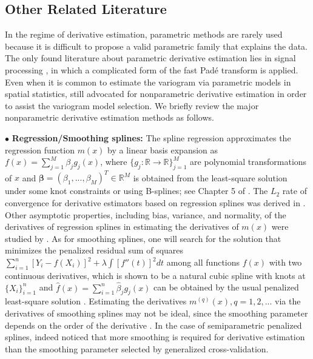 \documentclass{uwstat572}
\theoremstyle{definition}
\renewcommand{\hat}{\widehat}
\theoremstyle{theorem}
\begin{document}
\subsection{Other Related Literature}
\label{Sec:related_work}

In the regime of derivative estimation, parametric methods are rarely used because it is difficult to propose a valid parametric family that explains the data. The only found literature about parametric derivative estimation lies in signal processing \citep{belkic2018validation}, in which a complicated form of the fast Pad\'e transform is applied. Even when it is common to estimate the variogram via parametric models in spatial statistics, \cite{gorsich2000variogram} still advocated for nonparametric derivative estimation in order to assist the variogram model selection. We briefly review the major nonparametric derivative estimation methods as follows. 

$\bullet$ {\bf Regression/Smoothing splines:} The spline regression \citep{deboor1968splines} approximates the regression function $m(x)$ by a linear basis expansion as $f(x) = \sum_{j=1}^M \beta_j g_j(x)$, where $\{g_j:\mathbb{R}\to \mathbb{R}\}_{j=1}^M$ are polynomial transformations of $x$ and $\bm{\beta} = (\beta_1,...,\beta_M)^T \in \mathbb{R}^M$ is obtained from the least-square solution under some knot constraints or using B-splines; see Chapter 5 of \cite{hastie2009elements}. The $L_2$ rate of convergence for derivative estimators based on regression splines was derived in \cite{stone1985additive}. Other asymptotic properties, including bias, variance, and normality, of the derivatives of regression splines in estimating the derivatives of $m(x)$ were studied by \cite{zhou2000derivative}. As for smoothing splines, one will search for the solution that minimizes the penalized residual sum of squares $\sum_{i=1}^n \left[Y_i-f(X_i)\right]^2 + \lambda \int \left[f''(t)\right]^2 dt$ among all functions $f(x)$ with two continuous derivatives, which is shown to be a natural cubic spline with knots at $\{X_i\}_{i=1}^n$ and $\hat{f}(x)=\sum_{i=1}^n \hat{\beta}_j g_j(x)$ can be obtained by the usual penalized least-square solution \citep{hastie2009elements}. Estimating the derivatives $m^{(q)}(x), q=1,2,...$ via the derivatives of smoothing splines may not be ideal, since the smoothing parameter depends on the order of the derivative \citep{wahba1990optimal}. In the case of semiparametric penalized splines, \cite{jarrow2004estimating} indeed noticed that more smoothing is required for derivative estimation than the smoothing parameter selected by generalized cross-validation.
\end{document}
